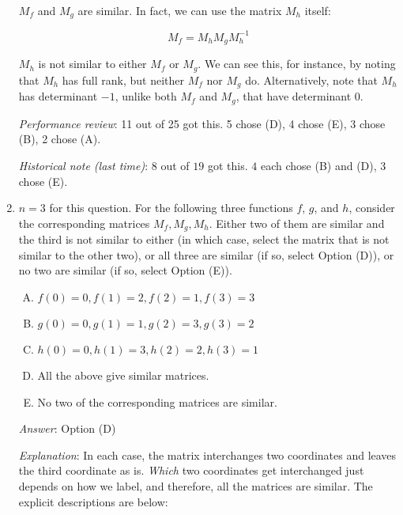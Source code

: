 \documentclass[10pt]{amsart}
\begin{document}
\begin{enumerate}
  $M_f$ and $M_g$ are similar. In fact, we can use the matrix $M_h$ itself:

  $$M_f = M_hM_gM_h^{-1}$$

  $M_h$ is not similar to either $M_f$ or $M_g$. We can see this, for
  instance, by noting that $M_h$ has full rank, but neither $M_f$ nor
  $M_g$ do. Alternatively, note that $M_h$ has determinant $-1$,
  unlike both $M_f$ and $M_g$, that have determinant $0$.

  {\em Performance review}: 11 out of 25 got this. 5 chose (D), 4
  chose (E), 3 chose (B), 2 chose (A).

  {\em Historical note (last time)}: $8$ out of $19$ got this. $4$ each chose
  (B) and (D), $3$ chose (E).


\item $n = 3$ for this question. For the following three functions
  $f$, $g$, and $h$, consider the corresponding matrices
  $M_f,M_g,M_h$. Either two of them are similar and the third is not
  similar to either (in which case, select the matrix that is not
  similar to the other two), or all three are similar (if so, select
  Option (D)), or no two are similar (if so, select Option (E)).

  \begin{enumerate}[(A)]
  \item $f(0) = 0, f(1) = 2, f(2) = 1, f(3) = 3$
  \item $g(0) = 0, g(1) = 1, g(2) = 3, g(3) = 2$
  \item $h(0) = 0, h(1) = 3, h(2) = 2, h(3) = 1$
  \item All the above give similar matrices.
  \item No two of the corresponding matrices are similar.
  \end{enumerate}

  {\em Answer}: Option (D)

  {\em Explanation}: In each case, the matrix interchanges two
  coordinates and leaves the third coordinate as is. {\em Which} two
  coordinates get interchanged just depends on how we label, and
  therefore, all the matrices are similar. The explicit descriptions
  are below:


\end{enumerate}
\end{document}
